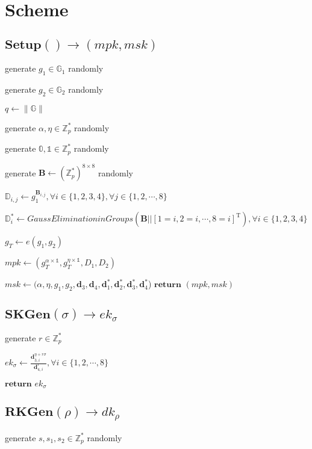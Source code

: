 \documentclass[a4paper]{article}
\begin{document}
\section{Scheme}

\subsection{$\textbf{Setup}() \rightarrow (\textit{mpk}, \textit{msk})$}

generate $g_1 \in \mathbb{G}_1$ randomly

generate $g_2 \in \mathbb{G}_2$ randomly

$q \gets \|\mathbb{G}\|$

generate $\alpha, \eta \in \mathbb{Z}_p^*$ randomly

generate $\mathbb{0}, \mathbb{1} \in \mathbb{Z}_p^*$ randomly

generate $\bm{B} \gets (\mathbb{Z}_p^*)^{8 \times 8}$ randomly

$\mathbb{D}_{i, j} \gets g_1^{\bm{B}_{i, j}}, \forall i \in \{1, 2, 3, 4\}, \forall j \in \{1, 2, \cdots, 8\}$

$\mathbb{D}_i^* \gets \textit{GaussEliminationinGroups}(\bm{B} || [1 = i, 2 = i, \cdots, 8 = i]^\mathrm{T}), \forall i \in \{1, 2, 3, 4\}$

$g_T \gets e(g_1, g_2)$

$\textit{mpk} \gets (g_T^{\alpha \times \mathbb{1}}, g_T^{\eta \times \mathbb{1}}, D_1, D_2)$

$\textit{msk} \gets (\alpha, \eta, g_1, g_2, \bm{d}_3, \bm{d}_4, \bm{d}_1^*, \bm{d}_2^*, \bm{d}_3^*, \bm{d}_4^*$)
$\textbf{return }(\textit{mpk}, \textit{msk})$
\subsection{$\textbf{SKGen}(\sigma) \rightarrow \textit{ek}_\sigma$}

generate $r \in \mathbb{Z}_p^*$

$\textit{ek}_\sigma \gets \frac{\bm{d}_{3, i}^{\eta + r \sigma}}{\bm{d}_{4, i}^r}, \forall i \in \{1, 2, \cdots, 8\}$

$\textbf{return }\textit{ek}_\sigma$

\subsection{$\textbf{RKGen}(\rho) \rightarrow \textit{dk}_\rho$}

generate $s, s_1, s_2 \in \mathbb{Z}_p^*$ randomly
\end{document}
